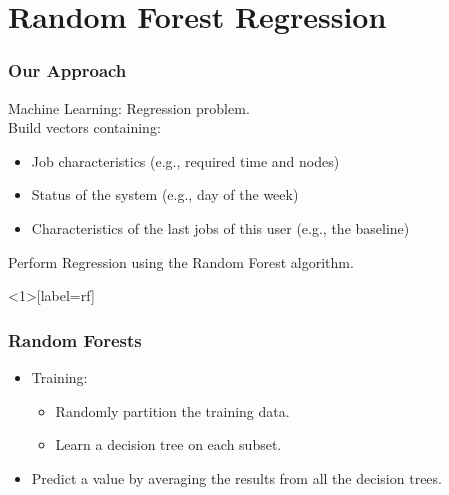 \documentclass{beamer}
\begin{document}
\section{Random Forest Regression}
\label{sec:predicting_runtime_with_random_forests}
\begin{frame}
  \frametitle{Our Approach}
  Machine Learning: Regression problem. \\
  \pause
  Build vectors containing:
  \begin{itemize}
      \pause
    \item Job characteristics (e.g., required time and nodes)
      \pause
    \item Status of the system (e.g., day of the week)
      \pause
    \item Characteristics of the last jobs of this user (e.g., the baseline)
  \end{itemize}
  \pause
  Perform Regression using the Random Forest algorithm.
\end{frame}


\begin{frame}<1>[label=rf]
  \frametitle{Random Forests}
  \begin{itemize}
    \item Training: \begin{itemize}
        \item Randomly partition the training data.
        \item Learn a decision tree on each subset.
      \end{itemize}
    \item<2> Predict a value by averaging the results from all the decision trees.
  \end{itemize}
\end{frame}
\end{document}
